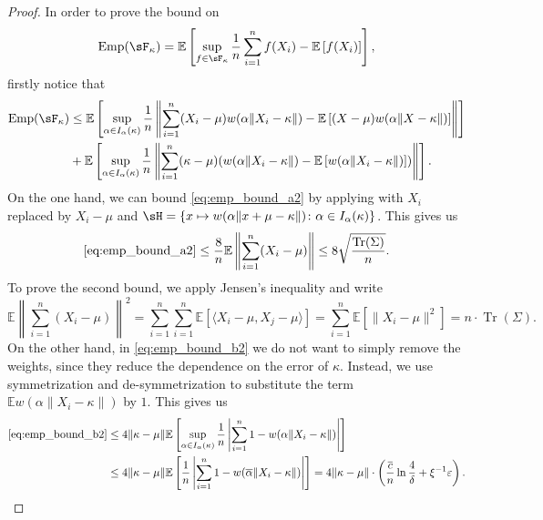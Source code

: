\documentclass{article}
\theoremstyle{plain}
\theoremstyle{definition}
\DeclareMathOperator{\tr}{Tr}
\DeclareMathOperator{\Emp}{Emp}
\begin{document}
\begin{appendix}
\begin{proof}
    In order to prove the bound on \[
\Emp(\sF_\kappa ) = \mathbb{E}\left[\sup_{f \in \sF_\kappa } \frac{1}{n}\sum_{i=1}^n f(X_i)-\mathbb{E}\left[f(X_i)\right]\right],
    \] 
firstly notice that \begin{align}
  \Emp(\sF_{\kappa })&\le \mathbb{E}\left[\sup_{\alpha \in I_\alpha(\kappa )} \frac{1}{n} \left\lVert\sum_{i=1}^n (X_i-\mu  )w(\alpha \|X_i - \kappa \|) - \mathbb{E}\left[(X-\mu )w(\alpha \|X-\kappa \|)\right]\right\rVert\right] \label{eq:emp_bound_a2}\\
                     &+ \mathbb{E}\left[\sup_{\alpha \in I_\alpha (\kappa )} \frac{1}{n} \left\lVert\sum_{i=1}^n(\kappa -\mu )(w(\alpha\lVert X_i -\kappa \rVert) - \mathbb{E}\left[w(\alpha \lVert X_i-\kappa \rVert)\right])\right\rVert\right].\label{eq:emp_bound_b2}
\end{align}  
On the one hand, we can bound \eqref{eq:emp_bound_a2} by applying  with \( X_i \) replaced by \( X_i - \mu  \) and \( \sH = \{ x \mapsto w(\alpha \|x +\mu -\kappa \|)\colon \alpha \in I_\alpha (\kappa )\}  \). This gives us \[
  \eqref{eq:emp_bound_a2} \le \frac{8}{n}\mathbb{E}\left\|\sum_{i=1}^n (X_i -\mu )\right\| \le 8\sqrt{\frac{\tr(\Sigma)}{n}}.
\]
To prove the second bound, we apply Jensen's inequality and write \[
  \mathbb{E}\left\lVert \sum_{i=1}^n (X_i - \mu )\right\rVert^2=\sum_{i=1}^n \sum_{i=1}^n \mathbb{E}\left[\langle X_i -\mu , X_j-\mu \rangle\right]=\sum_{i=1}^n \mathbb{E}\left[\lVert X_i -\mu \rVert^2\right]= n \cdot \tr(\Sigma ).
\] 
On the other hand, in \eqref{eq:emp_bound_b2} we do not want to simply remove the weights, since they reduce the dependence on the error of \( \kappa  \). Instead, we use symmetrization and de-symmetrization to substitute the term \( \mathbb{E}w(\alpha \|X_i -\kappa \|) \) by \( 1 \). This gives us \begin{align*}
  \eqref{eq:emp_bound_b2} &\le 4\lVert \kappa -\mu  \rVert \mathbb{E}\left[ \sup_{\alpha \in I_\alpha(\kappa )}\frac{1}{n} \left\lvert \sum_{i=1}^n 1-w(\alpha \lVert X_i -\kappa \rVert) \right\rvert \right]\\
                          &\le 4\lVert \kappa -\mu  \rVert \mathbb{E}\left[ \frac{1}{n} \left\lvert \sum_{i=1}^n 1-w(\overline{\alpha} \lVert X_i -\kappa \rVert) \right\rvert \right] = 4\lVert \kappa -\mu \rVert \cdot \left(\frac{\overline{c}}{n}\ln \frac{4}{\delta } + \xi^{-1} \varepsilon \right).
\end{align*}


\end{proof}
\end{appendix}
\end{document}
